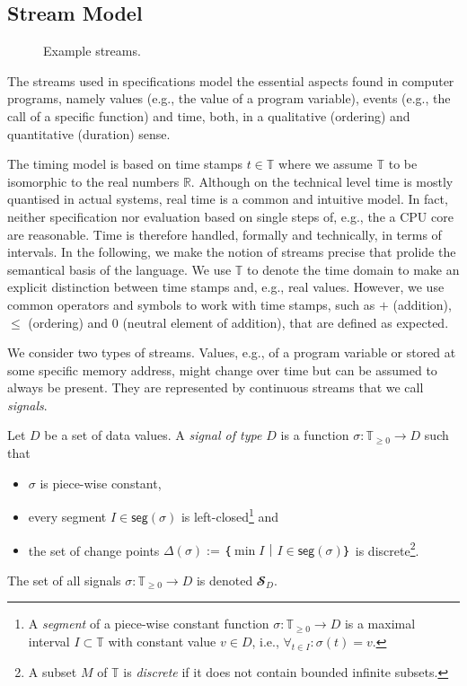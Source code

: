 \subsection{Stream Model}

\begin{figure}
  
  \caption{Example streams.\label{fig:streams}} 
\end{figure}

The streams used in \tessla specifications model the essential aspects found in computer programs, namely values (e.g., the value of a program variable), events (e.g., the call of a specific function) and time, both, in a qualitative (ordering) and quantitative (duration) sense.

The timing model is based on time stamps $t∈𝕋$ where we assume $𝕋$ to be isomorphic to the real numbers $ℝ$.
Although on the technical level time is mostly quantised in actual systems, real time is a common and intuitive model.
In fact, neither specification nor evaluation based on single steps of, e.g., the a CPU core are reasonable. 
Time is therefore handled, formally and technically, in terms of intervals.
In the following, we make the notion of streams precise that prolide the semantical basis of the language.
We use $𝕋$ to denote the time domain to make an explicit distinction between time stamps and, e.g., real values.
However, we use common operators and symbols to work with time stamps, such as $+$ (addition), $≤$ (ordering) and $0$ (neutral element of addition), that are defined as expected.

We consider two types of streams.
Values, e.g., of a program variable or stored at some specific memory address, might change over time but can be assumed to always be present.
They are represented by continuous streams that we call \emph{signals}. 

\begin{definition}[Signals]
  Let $D$ be a set of data values. 
  A \emph{signal of type $D$} is a function $σ: 𝕋_{≥0} → D$ such that
  \begin{itemize}
    \item $σ$ is piece-wise constant,
    \item every segment $I∈\mathsf{seg}(σ)$ is left-closed\footnote{
          A \emph{segment} of a piece-wise constant function $σ: 𝕋_{≥0} → D$ is a maximal interval $I⊂𝕋$ with constant value $v∈D$, i.e., $∀_{t∈I}:σ(t)=v$.} and
    \item the set of change points $Δ(σ) := ｛\min I｜I∈\mathsf{seg}(σ)｝$ is discrete\footnote{A subset $M$ of $𝕋$ is \emph{discrete} if it does not contain bounded infinite subsets.}.
  \end{itemize}
  The set of all signals $σ: 𝕋_{≥0} → D$ is denoted $𝓢_D$.
\end{definition}

